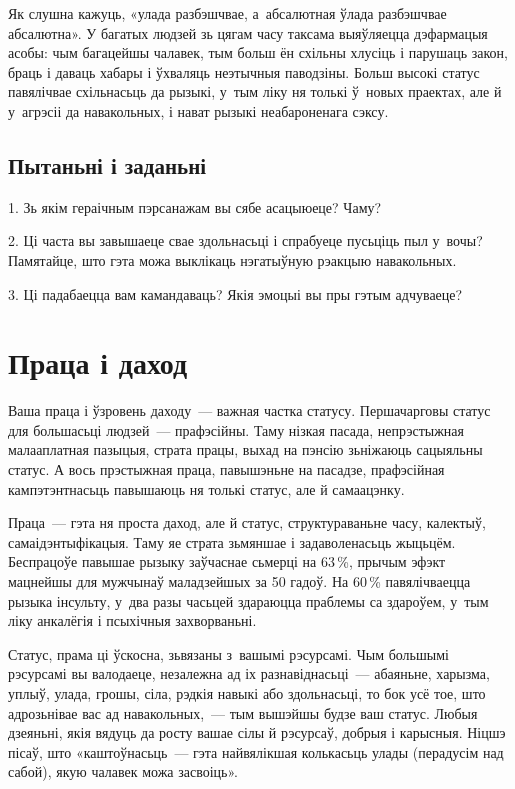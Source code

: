Як слушна кажуць, «улада разбэшчвае, а~абсалютная ўлада разбэшчвае абсалютна». У багатых людзей зь цягам часу таксама выяўляецца дэфармацыя асобы: чым багацейшы чалавек, тым больш ён схільны хлусіць і парушаць закон, браць і даваць хабары і ўхваляць неэтычныя паводзіны. Больш высокі статус павялічвае схільнасьць да рызыкі, у~тым ліку ня толькі ў~новых праектах, але й у~агрэсіі да навакольных, і нават рызыкі неабароненага сэксу.

\subsection*{Пытаньні і заданьні}

1. Зь якім гераічным пэрсанажам вы сябе асацыюеце? Чаму?

2. Ці часта вы завышаеце свае здольнасьці і спрабуеце пусьціць пыл у~вочы? Памятайце, што гэта можа выклікаць нэгатыўную рэакцыю навакольных.

3. Ці падабаецца вам камандаваць? Якія эмоцыі вы пры гэтым адчуваеце?


\section{Праца і даход}

Ваша праца і ўзровень даходу~--- важная частка статусу. Першачарговы статус для большасьці людзей~--- прафэсійны. Таму нізкая пасада, непрэстыжная малааплатная пазыцыя, страта працы, выхад на пэнсію зьніжаюць сацыяльны статус. А вось прэстыжная праца, павышэньне на пасадзе, прафэсійная кампэтэнтнасьць павышаюць ня толькі статус, але й самаацэнку.

Праца~--- гэта ня проста даход, але й статус, структураваньне часу, калектыў, самаідэнтыфікацыя. Таму яе страта зьмяншае і задаволенасьць жыцьцём. Беспрацоўе павышае рызыку заўчаснае сьмерці на 63\,\%, прычым эфэкт мацнейшы для мужчынаў маладзейшых за 50 гадоў. На 60\,\% павялічваецца рызыка інсульту, у~два разы часьцей здараюцца праблемы са здароўем, у~тым ліку анкалёгія і псыхічныя захворваньні.

Статус, прама ці ўскосна, зьвязаны з~вашымі рэсурсамі. Чым большымі рэсурсамі вы валодаеце, незалежна ад іх разнавіднасьці~--- абаяньне, харызма, уплыў, улада, грошы, сіла, рэдкія навыкі або здольнасьці, то бок усё тое, што адрозьнівае вас ад навакольных,~--- тым вышэйшы будзе ваш статус. Любыя дзеяньні, якія вядуць да росту вашае сілы й рэсурсаў, добрыя і карысныя. Ніцшэ пісаў, што «каштоўнасьць~--- гэта найвялікшая колькасьць улады (перадусім над сабой), якую чалавек можа засвоіць».

